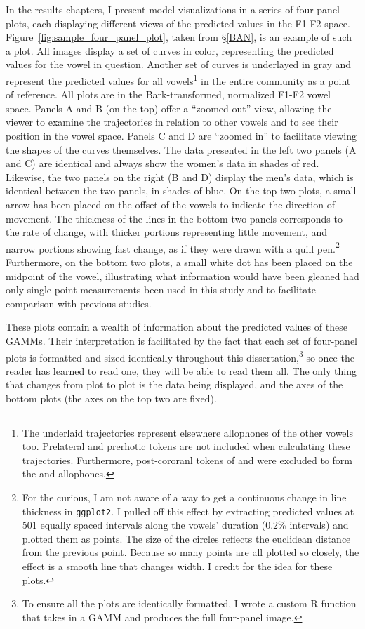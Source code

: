 In the results chapters, I present model visualizations in a series of four-panel plots, each displaying different views of the predicted values in the F1-F2 space. Figure~\ref{fig:sample_four_panel_plot}, taken from \S\ref{BAN}, is an example of such a plot. All images display a set of curves in color, representing the predicted values for the vowel in question. Another set of curves is underlayed in gray and represent the predicted values for all vowels\footnote{The underlaid trajectories represent elsewhere allophones of the other vowels too. Prelateral and prerhotic tokens are not included when calculating these trajectories. Furthermore, post-cororanl tokens of \goose and \goat were excluded to form the \boot and \boat allophones.} in the entire community as a point of reference. All plots are in the Bark-transformed, normalized F1-F2 vowel space. Panels A and B (on the top) offer a ``zoomed out'' view, allowing the viewer to examine the trajectories in relation to other vowels and to see their position in the vowel space. Panels C and D are ``zoomed in'' to facilitate viewing the shapes of the curves themselves. The data presented in the left two panels (A and C) are identical and always show the women’s data in shades of red. Likewise, the two panels on the right (B and D) display the men’s data, which is identical between the two panels, in shades of blue. On the top two plots, a small arrow has been placed on the offset of the vowels to indicate the direction of movement. The thickness of the lines in the bottom two panels corresponds to the rate of change, with thicker portions representing little movement, and narrow portions showing fast change, as if they were drawn with a quill pen.\footnote{For the curious, I am not aware of a way to get a continuous change in line thickness in \texttt{ggplot2}. I pulled off this effect by extracting predicted values at 501 equally spaced intervals along the vowels' duration (0.2\% intervals) and plotted them as points. The size of the circles reflects the euclidean distance from the previous point. Because so many points are all plotted so closely, the effect is a smooth line that changes width. I credit \citet{fruehwald_2017_gamm} for the idea for these plots.} Furthermore, on the bottom two plots, a small white dot has been placed on the midpoint of the vowel, illustrating what information would have been gleaned had only single-point measurements been used in this study and to facilitate comparison with previous studies.

These plots contain a wealth of information about the predicted values of these GAMMs. Their interpretation is facilitated by the fact that each set of four-panel plots is formatted and sized identically throughout this dissertation,\footnote{To ensure all the plots are identically formatted, I wrote a custom R function that takes in a GAMM and produces the full four-panel image.} so once the reader has learned to read one, they will be able to read them all. The only thing that changes from plot to plot is the data being displayed, and the axes of the bottom plots (the axes on the top two are fixed).


